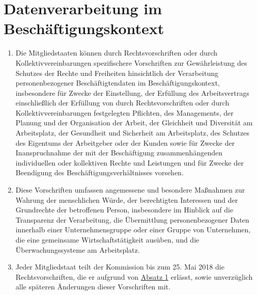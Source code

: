 \chapter{Datenverarbeitung im Beschäftigungskontext}
\label{ch:88}


\begin{enumerate}

  \item Die Mitgliedstaaten können durch Rechtsvorschriften oder durch Kollektivvereinbarungen spezifischere
   Vorschriften zur Gewährleistung des Schutzes der Rechte und Freiheiten hinsichtlich der Verarbeitung
   personenbezogener Beschäftigtendaten im Beschäftigungskontext, insbesondere für Zwecke der Einstellung, der
   Erfüllung des Arbeitsvertrags einschließlich der Erfüllung von durch Rechtsvorschriften oder durch
   Kollektivvereinbarungen festgelegten Pflichten, des Managements, der Planung und der Organisation der Arbeit, der
   Gleichheit und Diversität am Arbeitsplatz, der Gesundheit und Sicherheit am Arbeitsplatz, des Schutzes des Eigentums
   der Arbeitgeber oder der Kunden sowie für Zwecke der Inanspruchnahme der mit der Beschäftigung zusammenhängenden
   individuellen oder kollektiven Rechte und Leistungen und für Zwecke der Beendigung des Beschäftigungsverhältnisses
   vorsehen.
  \label{itm:88-1}

  \item Diese Vorschriften umfassen angemessene und besondere Maßnahmen zur Wahrung der menschlichen Würde, der
   berechtigten Interessen und der Grundrechte der betroffenen Person, insbesondere im Hinblick auf die Transparenz der
   Verarbeitung, die Übermittlung personenbezogener Daten innerhalb einer Unternehmensgruppe oder einer Gruppe von
   Unternehmen, die eine gemeinsame Wirtschaftstätigkeit ausüben, und die Überwachungssysteme am Arbeitsplatz.
  \label{itm:88-2}

  \item Jeder Mitgliedstaat teilt der Kommission bis zum 25. Mai 2018 die Rechtsvorschriften, die er aufgrund von
   \hyperref[itm:88-1]{Absatz 1} erlässt, sowie unverzüglich alle späteren Änderungen dieser Vorschriften mit.
  \label{itm:88-3}

\end{enumerate}


